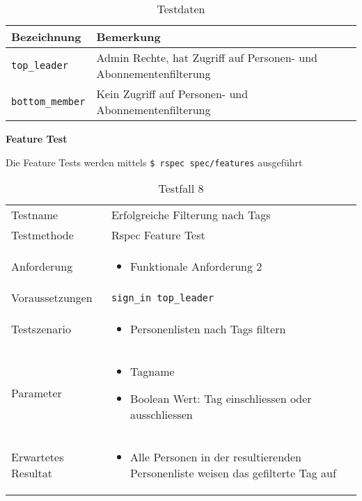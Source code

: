 \begin{table}[h!]
   \begin{tabular}{|L{0.4\textwidth}|L{0.6\textwidth}|}
       \hline
        \color{white}\textbf{Bezeichnung} & \color{white}\textbf{Bemerkung}  \\[12pt]
       \hline
       \texttt{top\_leader} & Admin Rechte, hat Zugriff auf Personen- und Abonnementenfilterung \\
       \hline
       \texttt{bottom\_member} & Kein Zugriff auf Personen- und Abonnementenfilterung \\
       \hline
     \end{tabular}
     \caption{Testdaten}
\end{table}

\newpage

\textbf{Feature Test}

Die Feature Tests werden mittels \texttt{\$ rspec spec/features} ausgeführt

\begin{table}[h!]
   \begin{tabular}{|L{0.4\textwidth}|L{0.6\textwidth}|}
       \hline
         \\[12pt]
       \hline
        Testname & Erfolgreiche Filterung nach Tags \\
       \hline
       Testmethode & Rspec Feature Test \\
       \hline
        Anforderung & 
        \begin{itemize}
         \item Funktionale Anforderung 2
         \end{itemize}  \\
       \hline
       Voraussetzungen & \texttt{sign\_in top\_leader} \\
       \hline
       Testszenario & 
       \begin{itemize}
         \item Personenlisten nach Tags filtern
       \end{itemize} \\
       \hline
       Parameter & 
       \begin{itemize}
         \item Tagname
         \item Boolean Wert: Tag einschliessen oder ausschliessen
       \end{itemize} \\
       Erwartetes Resultat & 
       \begin{itemize}
         \item Alle Personen in der resultierenden Personenliste weisen das gefilterte Tag auf
       \end{itemize} \\
     \hline
     \end{tabular}
     \caption{Testfall 8}
\end{table}


